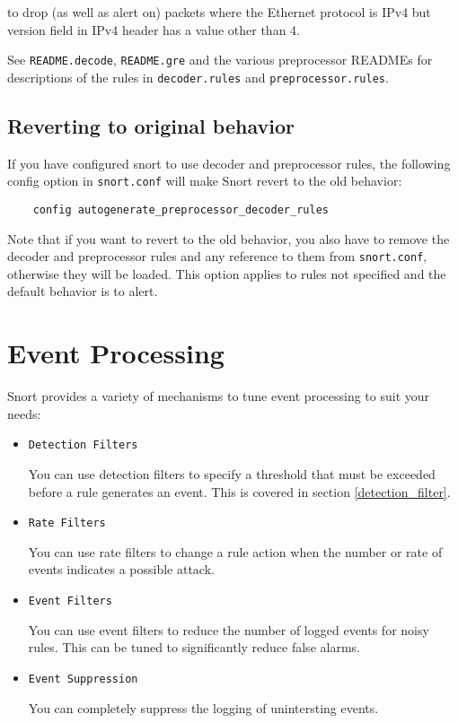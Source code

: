 \documentclass[english]{report}
\begin{document}
to drop (as well as alert on) packets where the Ethernet protocol is IPv4 but
version field in IPv4 header has a value other than 4.

See \texttt{README.decode}, \texttt{README.gre} and the various preprocessor
READMEs for descriptions of the rules in \texttt{decoder.rules} and
\texttt{preprocessor.rules}.

\subsection{Reverting to original behavior}

If you have configured snort to use decoder and preprocessor rules, the
following config option in \texttt{snort.conf} will make Snort revert to the
old behavior:

\begin{verbatim}
    config autogenerate_preprocessor_decoder_rules
\end{verbatim}

Note that if you want to revert to the old behavior, you also have to remove
the decoder and preprocessor rules and any reference to them from
\texttt{snort.conf}, otherwise they will be loaded.  This option applies to
rules not specified and the default behavior is to alert.

\section{Event Processing}

Snort provides a variety of mechanisms to tune event processing to suit your
needs:

\begin{itemize} 
\item \texttt{Detection Filters} 

You can use detection filters to specify a threshold that must be exceeded
before a rule generates an event.  This is covered in section
\ref{detection_filter}.

\item \texttt{Rate Filters} 

You can use rate filters to change a rule action when the number or rate of
events indicates a possible attack.

\item \texttt{Event Filters} 

You can use event filters to reduce the number of logged events for noisy
rules.  This can be tuned to significantly reduce false alarms.

\item \texttt{Event Suppression} 

You can completely suppress the logging of unintersting events.

\end{itemize} 
\end{document}
